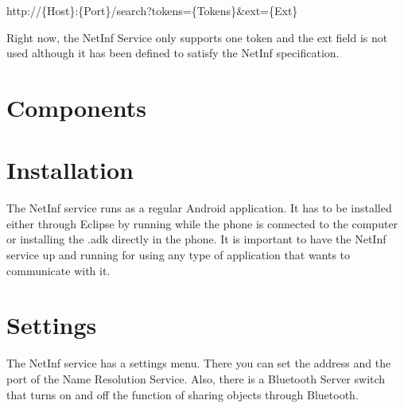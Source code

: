 \documentclass[10pt,a4paper]{article}
\begin{document}
\begin{center}
http://\{Host\}:\{Port\}/search?tokens=\{Tokens\}\&ext=\{Ext\}\\
\end{center}
Right now, the NetInf Service only supports one token and the ext field is not used although it has been defined to satisfy the NetInf specification.\\


\section{Components}

\section{Installation}
The NetInf service runs as a regular Android application. It has to be installed either through Eclipse by running while the phone is connected to the computer 
or installing the .adk directly in the phone. It is important to have the NetInf service up and running for using any type of application that wants to communicate with it. \\


\section{Settings}
The NetInf service has a settings menu. There you can set the address and the port of the Name Resolution Service. Also, there is a Bluetooth Server switch that turns on 
and off the function of sharing objects through Bluetooth.\\
\end{document}
